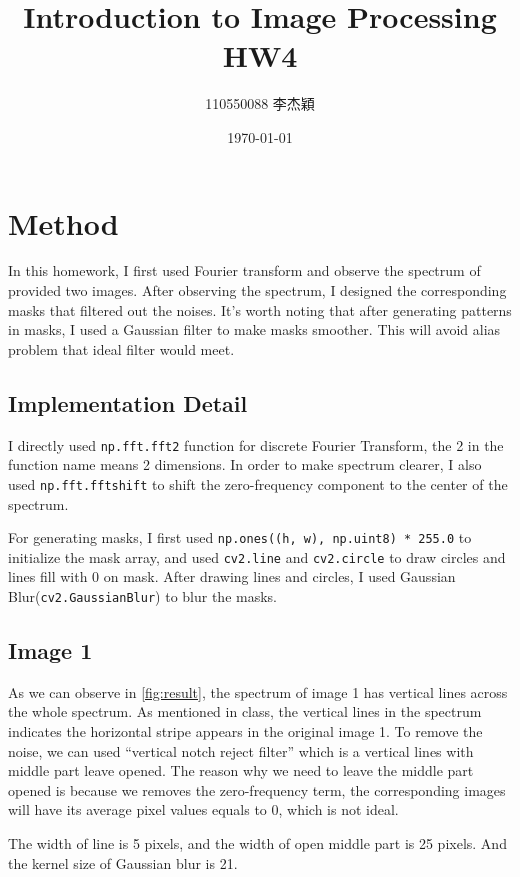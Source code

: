 \documentclass[twocolumn]{extarticle}
\title{Introduction to Image Processing HW4}
\author{110550088 李杰穎}
\date{\today}
\begin{document}
\maketitle

\section{Method}

In this homework, I first used Fourier transform and observe the spectrum of provided two images. After observing the spectrum, I designed the corresponding masks that filtered out the noises. It's worth noting that after generating patterns in masks, I used a Gaussian filter to make masks smoother. This will avoid alias problem that ideal filter 
would meet.

\subsection{Implementation Detail}

I directly used \texttt{np.fft.fft2} function for discrete Fourier Transform, the 2 in the function name means 2 dimensions. In order to make spectrum clearer, I also used \texttt{np.fft.fftshift} to shift the zero-frequency component to the center of the spectrum.

For generating masks, I first used \texttt{np.ones((h, w), np.uint8) * 255.0} to initialize the mask array, and used \texttt{cv2.line} and \texttt{cv2.circle} to draw circles and lines fill with 0 on mask. After drawing lines and circles, I used Gaussian Blur(\texttt{cv2.GaussianBlur}) to blur the masks.

\subsection{Image 1}

As we can observe in \autoref{fig:result}, the spectrum of image 1 has vertical lines across the whole spectrum. As mentioned in class, the vertical lines in the spectrum indicates the horizontal stripe appears in the original image 1. To remove the noise, we can used ``vertical notch reject filter'' which is a vertical lines with middle part leave opened. The reason why we need to leave the middle part opened is because we removes the zero-frequency term, the corresponding images will have its average pixel values equals to 0, which is not ideal.

The width of line is 5 pixels, and the width of open middle part is 25 pixels. And the kernel size of Gaussian blur is 21.
\end{document}
